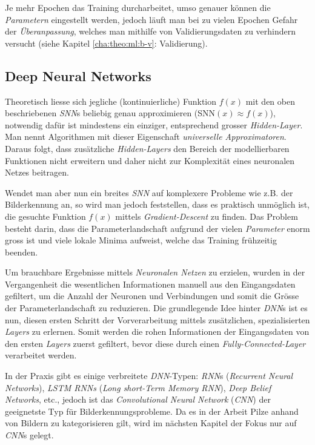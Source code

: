 Je mehr Epochen das Training durcharbeitet, umso genauer können die \textit{Parametern} eingestellt werden, jedoch läuft man bei zu vielen Epochen Gefahr der \textit{Überanpassung}, welches man mithilfe von Validierungsdaten zu verhindern versucht (siehe Kapitel \ref{cha:theo:ml:b-v}: Validierung).


\subsection[DNNs]{Deep Neural Networks}\label{cha:theo:dl}
Theoretisch liesse sich jegliche (kontinuierliche) Funktion $f(x)$ mit den oben beschriebenen \textit{SNN}s beliebig genau approximieren (SNN$(x) \approx f(x)$), notwendig dafür ist mindestens ein einziger, entsprechend grosser \textit{Hidden-Layer}\cite{hornik}. Man nennt Algorithmen mit dieser Eigenschaft \textit{universelle Approximatoren}. Daraus folgt, dass zusätzliche \textit{Hidden-Layers} den Bereich der modellierbaren Funktionen nicht erweitern und daher nicht zur Komplexität eines neuronalen Netzes beitragen\footnotemark.


Wendet man aber nun ein breites \textit{SNN} auf komplexere Probleme wie z.B. der Bilderkennung an, so wird man jedoch feststellen, dass es praktisch unmöglich ist, die gesuchte Funktion $f(x)$ mittels \textit{Gradient-Descent} zu finden. Das Problem besteht darin, dass die Parameterlandschaft aufgrund der vielen \textit{Parameter} enorm gross ist und viele lokale Minima aufweist, welche das Training frühzeitig beenden.

Um brauchbare Ergebnisse mittels \textit{Neuronalen Netzen} zu erzielen, wurden in der Vergangenheit die wesentlichen Informationen manuell aus den Eingangsdaten gefiltert, um die Anzahl der Neuronen und Verbindungen und somit die Grösse der Parameterlandschaft zu reduzieren. Die grundlegende Idee hinter \textit{DNN}s ist es nun, diesen ersten Schritt der Vorverarbeitung mittels zusätzlichen, spezialisierten \textit{Layers} zu erlernen. Somit werden die rohen Informationen der Eingangsdaten von den ersten \textit{Layers} zuerst gefiltert, bevor diese durch einen \textit{Fully-Connected-Layer} verarbeitet werden.

In der Praxis gibt es einige verbreitete \textit{DNN}-Typen: \textit{RNN}s (\textit{Recurrent Neural Networks}), \textit{LSTM RNNs} (\textit{Long short-Term Memory RNN}), \textit{Deep Belief Networks}, etc., jedoch ist das \textit{Convolutional Neural Network} (\textit{CNN}) der geeignetste Typ für Bilderkennungsprobleme. Da es in der Arbeit Pilze anhand von Bildern zu kategorisieren gilt, wird im nächsten Kapitel der Fokus nur auf \textit{CNN}s gelegt.


